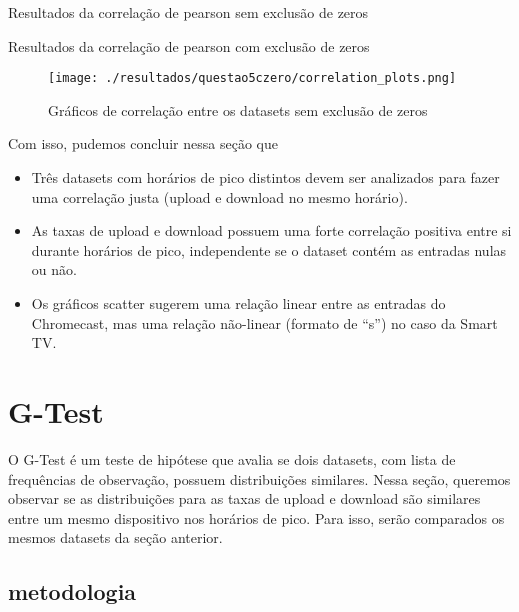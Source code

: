 \documentclass{article}
\begin{document}
\begin{table}[h]
	\centering
	
	\caption{Resultados da correlação de pearson sem exclusão de zeros}
	\label{tab:questao5-resultados-correlacao}
\end{table}

\begin{table}[h]
	\centering
	
	\caption{Resultados da correlação de pearson com exclusão de zeros}
	\label{tab:questao5-resultados-correlacao-semzero}
\end{table}

\begin{figure}[h]
	\centering
	\caption{Gráficos de correlação entre os datasets sem exclusão de zeros}
	\texttt{[image: ./resultados/questao5czero/correlation\_plots.png]}
	\label{fig:questao5-scatter-plots}
\end{figure}

Com isso, pudemos concluir nessa seção que
\begin{itemize}
	\item Três datasets com horários de pico distintos devem ser analizados para fazer uma correlação justa (upload e download no mesmo horário).
	\item As taxas de upload e download possuem uma forte correlação positiva entre si durante horários de pico, independente se o dataset contém as entradas nulas ou não.
	\item Os gráficos scatter sugerem uma relação linear entre as entradas do Chromecast, mas uma relação não-linear (formato de ``s'') no caso da Smart TV.
\end{itemize}

\section{G-Test}

O G-Test é um teste de hipótese que avalia se dois datasets, com lista de frequências de observação, possuem distribuições similares. Nessa seção, queremos observar se as distribuições para as taxas de upload e download são similares entre um mesmo dispositivo nos horários de pico. Para isso, serão comparados os mesmos datasets da seção anterior.

\subsection{metodologia}
\end{document}
